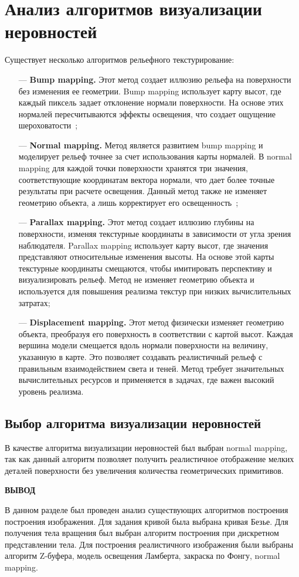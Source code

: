 \section{Анализ алгоритмов визуализации неровностей}
Существует несколько алгоритмов рельефного текстурирование:
\begin{itemize}
    \item[---] \textbf{Bump mapping.} Этот метод создает иллюзию рельефа на поверхности без изменения ее геометрии. Bump mapping использует карту высот, где каждый пиксель задает отклонение нормали поверхности. На основе этих нормалей пересчитываются эффекты освещения, что создает ощущение шероховатости~\cite{Текстурирование};
    \item[---] \textbf{Normal mapping.} Метод является развитием bump mapping и моделирует рельеф точнее за счет использования карты нормалей. В normal mapping для каждой точки поверхности хранятся три значения, соответствующие координатам вектора нормали, что дает более точные результаты при расчете освещения. Данный метод также не изменяет геометрию объекта, а лишь корректирует его освещенность~\cite{mapping};
    \item[---] \textbf{Parallax mapping.} Этот метод создает иллюзию глубины на поверхности, изменяя текстурные координаты в зависимости от угла зрения наблюдателя. Parallax mapping использует карту высот, где значения представляют относительные изменения высоты. На основе этой карты текстурные координаты смещаются, чтобы имитировать перспективу и визуализировать рельеф. Метод не изменяет геометрию объекта и используется для повышения реализма текстур при низких вычислительных затратах;
    \item[---] \textbf{Displacement mapping.} Этот метод физически изменяет геометрию объекта, преобразуя его поверхность в соответствии с картой высот. Каждая вершина модели смещается вдоль нормали поверхности на величину, указанную в карте. Это позволяет создавать реалистичный рельеф с правильным взаимодействием света и теней. Метод требует значительных вычислительных ресурсов и применяется в задачах, где важен высокий уровень реализма.
\end{itemize}

\subsection{Выбор алгоритма визуализации неровностей}
В качестве алгоритма визуализации неровностей был выбран normal mapping, так как данный алгоритм позволяет получить реалистичное отображение мелких деталей поверхности без увеличения количества геометрических примитивов. 

\textbf{ВЫВОД}

В данном разделе был проведен анализ существующих алгоритмов построения построения изображения. Для задания кривой была выбрана кривая Безье. Для получения тела вращения был выбран алгоритм построения при дискретном представлении тела. Для построения реалистичного изображения были выбраны алгоритм Z-буфера, модель освещения Ламберта, закраска по Фонгу, normal mapping. 
